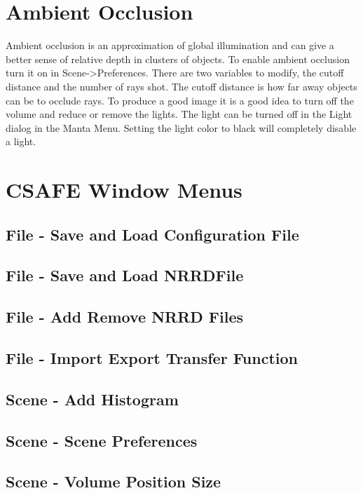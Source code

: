 \section{Ambient Occlusion}
  Ambient occlusion is an approximation of global illumination and can give a better sense of relative depth in clusters of objects.  To enable ambient occlusion turn it on in Scene->Preferences.  There are two variables to modify, the cutoff distance and the number of rays shot.  The cutoff distance is how far away objects can be to occlude rays.  To produce a good image it is a good idea to turn off the volume and reduce or remove the lights.  The light can be turned off in the Light dialog in the Manta Menu.  Setting the light color to black will completely disable a light.
  
\section{CSAFE Window Menus}

\subsection{File - Save and Load Configuration File}

\subsection{File - Save and Load NRRDFile}

\subsection{File - Add Remove NRRD Files}

\subsection{File - Import Export Transfer Function}

\subsection{Scene - Add Histogram}

\subsection{Scene - Scene Preferences}

\subsection{Scene - Volume Position Size}

